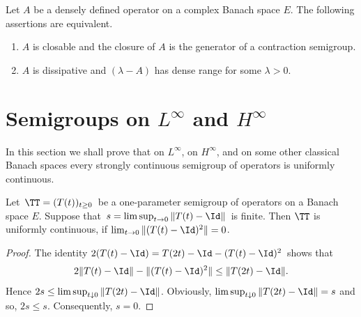 \begin{theorem}\label{thm:a2-2.13}
Let $A$ be a densely defined operator on a complex Banach space $E$.
The following assertions are equivalent.
\begin{enumerate}[\upshape (a)]	
\item \label{thm:a2-2.13.1}
$A$ is closable and the closure of\/ $A$ is the generator of a contraction semigroup.
\item \label{thm:a2-2.13.2}
$A$ is dissipative and $(\lambda - A)$ has dense range for some $\lambda > 0$.
\end{enumerate}
\end{theorem}
\section{Semigroups on \texorpdfstring{$L^{\infty}$}{L-infty}  and \texorpdfstring{$H^{\infty}$}{H-infty} \label{sec:a2-3}}%
\hspace{1cm}{\Large by Heinrich P. Lotz}
\vspace{.5cm}
\newline
In this section we shall prove that on $L^\infty$, on $H^\infty$, and on some other classical Banach spaces every strongly continuous semigroup of operators is uniformly continuous.
\begin{lemma}\label{lem:a2-3.1}
Let\, $\TT = (T(t))_{t\geq 0}$\, be a one-parameter semigroup of operators on a Banach space $E$.
Suppose that\, $s = \lim\sup_{t\to 0} \|T(t) - \Id\|$\, is finite.
Then $\TT$ is uniformly continuous, if\/ $\lim_{t\to 0} \|(T(t) - \Id)^2\| = 0$.
\end{lemma}
\begin{proof}
The identity  $2(T(t) - \Id) = T(2t) - \Id - (T(t) - \Id)^2$\, shows that
\[
	2\|T(t) - \Id\| - \|(T(t) - \Id)^{2} \| \leq \|T(2t) - \Id\| .
\]
Hence $2s \leq \lim \sup_{t \downarrow 0} \|T(2t) - \Id\|$.
Obviously, $\lim \sup_{t \downarrow 0} \|T(2t) - \Id\| = s$ and so, $2s \leq s$.
Consequently, $s = 0$.
\end{proof}
